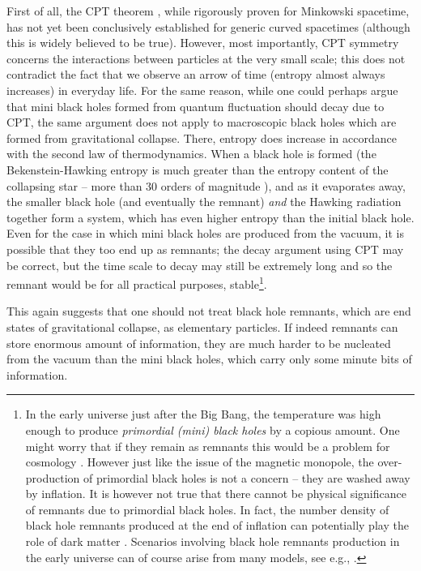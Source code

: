 \documentclass[12pt]{article}
\newcommand{\2}{$^2$}
\newcommand{\3}{$^3$}
\newcommand{\4}{$_4$}
\newcommand{\5}{$_5$}
\begin{document}
First of all, the CPT theorem \cite{gerhart}, while rigorously proven for Minkowski spacetime, has not yet been conclusively established for generic curved spacetimes (although this is widely believed to be true). However, most importantly, CPT symmetry concerns the interactions between particles at the very small scale; this does not contradict the fact that we observe an arrow of time (entropy almost always increases) in everyday life. For the same reason, while one could perhaps argue that mini black holes formed from quantum fluctuation should decay due to CPT, the same argument does not apply to macroscopic black holes which are formed from gravitational collapse. There, entropy does increase in accordance with the second law of thermodynamics. When a black hole is formed (the Bekenstein-Hawking entropy is much greater than the entropy content of the collapsing star -- more than 30 orders of magnitude \cite{clarify}), and as it evaporates away, the smaller black hole (and eventually the remnant) \emph{and} the Hawking radiation together form a system, which has even higher entropy than the initial black hole. Even for the case in which mini black holes are produced from the vacuum, it is possible that they too end up as remnants; the decay argument using CPT may be correct, but the time scale to decay may still be extremely long and so the remnant would be for all practical purposes, stable\footnote{In the early universe just after the Big Bang, the temperature was high enough to produce \emph{primordial (mini) black holes} \cite{carr} by a copious amount. One might worry that if they remain as remnants this would be a problem for cosmology \cite{tegmark}. However just like the issue of  the magnetic monopole, the over-production of primordial black holes is not a concern -- they are washed away by inflation. It is however not true that there cannot be physical significance of remnants due to primordial black holes. In fact, the number density of black hole remnants produced at the end of inflation can potentially play the role of dark matter \cite{pisinDM}. {\color{black} Scenarios involving black hole remnants production in the early universe can  of course arise from many models, see e.g., \cite{1102.5096}.}}. 

This again suggests that one should not treat black hole remnants, which are end states of gravitational collapse, as elementary particles. If indeed remnants can store enormous amount of information, they are much harder to be nucleated from the vacuum than the mini black holes, which carry only some minute bits of information. 
\end{document}
